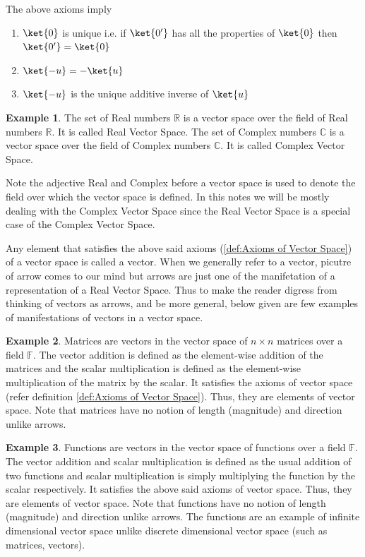 \documentclass[12pt, oneside]{book}
\theoremstyle{definition}
\theoremstyle{definition}
\newtheorem{example}{Example}[section]
\theoremstyle{remark}
\begin{document}
The above axioms imply
\begin{enumerate}
    \item $\ket{0}$ is unique i.e. if $\ket{0'}$ has all the properties of $\ket{0}$ then $\ket{0'}=\ket{0}$
    \item $\ket{-u}=-\ket{u}$ 
    \item $\ket{-u}$ is the unique additive inverse of $\ket{u}$
\end{enumerate}

\begin{example}
    The set of Real numbers $\mathbb{R}$ is a vector space over the field of Real numbers $\mathbb{R}$. It is called Real Vector Space.
    The set of Complex numbers $\mathbb{C}$ is a vector space over the field of Complex numbers $\mathbb{C}$. It is called Complex 
    Vector Space.
\end{example}
Note the adjective Real and Complex before a vector space is used to denote the field over which the vector space is defined.
In this notes we will be mostly dealing with the Complex Vector Space since the Real Vector Space is a special case of the Complex Vector Space.

Any element that satisfies the above said axioms (\ref{def:Axioms of Vector Space}) of a vector space is called a vector. When we generally refer to a vector, picutre of arrow comes to our mind but
arrows are just one of the manifetation of a representation of a Real Vector Space. Thus to make the reader digress from thinking of vectors as arrows, and be more general, 
below given are few examples of manifestations of vectors in a vector space.

\begin{example}
    Matrices are vectors in the vector space of $n\times n$ matrices over a field $\mathbb{F}$. The vector addition is defined as the element-wise addition of the matrices and the scalar multiplication
    is defined as the element-wise multiplication of the matrix by the scalar. It satisfies the axioms of vector space (refer definition \ref{def:Axioms of Vector Space}).
    Thus, they are elements of vector space. Note that matrices have no notion of length (magnitude) and direction unlike arrows.
\end{example}

\begin{example}
    Functions are vectors in the vector space of functions over a field $\mathbb{F}$. The vector addition and scalar multiplication is defined as the usual addition of two functions
    and scalar multiplication is simply multiplying the function by the scalar respectively. It satisfies the above said axioms of vector space.
    Thus, they are elements of vector space. Note that functions have no notion of length (magnitude) and direction unlike arrows. The functions are an example of infinite 
    dimensional vector space unlike discrete dimensional vector space (such as matrices, vectors).
\end{example}
\end{document}
